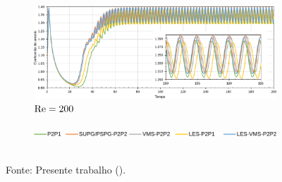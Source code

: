 \begin{figure}[h!]
\begin{subfigure}{\textwidth}
        \includegraphics[width=\linewidth]{Figuras/cylinder/analise3/Cd-200.pdf}
        \caption{$\mathrm{Re}=200$}
    \end{subfigure}
    \begin{subfigure}{.8\textwidth}
        \includegraphics[width=\linewidth]{Figuras/cylinder/legenda.pdf}
    \end{subfigure}
    \\Fonte: Presente trabalho (\the\year).
    \label{fig:cyl-Cd}
\end{figure}

